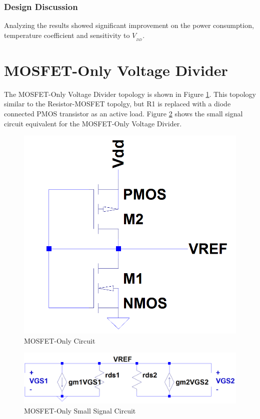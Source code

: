 \documentclass[conference]{IEEEtran}
\begin{document}
\subsubsection{Design Discussion}
Analyzing the results showed significant improvement on the power consumption, temperature coefficient and sensitivity to $V_{_{DD}}$.

\section{MOSFET-Only Voltage Divider}
The MOSFET-Only Voltage Divider topology is shown in Figure \ref{fig:mosfet-only1}.  This topology similar to the Resistor-MOSFET topolgy, but R1 is replaced with a diode connected PMOS transistor as an active load.  Figure \ref{fig:mosfet-only1-ss} shows the small signal circuit equivalent for the MOSFET-Only Voltage Divider.

\begin{figure}[!htbp]
  \centering
  \includegraphics[scale=0.25]{images/mosfet-only1.png}
  \caption[mosfet-only1]{MOSFET-Only Circuit}
  \label{fig:mosfet-only1}
\end{figure}

\begin{figure}[!htbp]
  \centering
  \includegraphics[scale=0.25]{images/mosfet-only1-ss.png}
  \caption[mosfet-only1-ss]{MOSFET-Only Small Signal Circuit}
  \label{fig:mosfet-only1-ss}
\end{figure}
\end{document}
